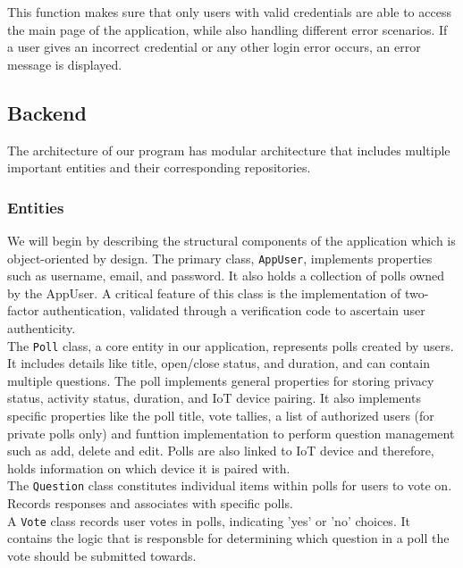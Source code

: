 \noindent This function makes sure that only users with valid credentials are able to access the main page of the application, while also handling 
different error scenarios. If a user gives an incorrect credential or any other login error occurs, an error message is displayed. \\

\subsection{Backend}
The architecture of our program has modular architecture that includes multiple important entities and their corresponding repositories.

\subsubsection{Entities}
We will begin by describing the structural components of the application which is object-oriented by design. The primary class, \texttt{AppUser}, implements properties such as username, email, and password. It also holds a collection of polls owned by the AppUser.  A critical feature of this class is the implementation of two-factor authentication, validated through a verification code to ascertain user authenticity. \\

\noindent The \texttt{Poll} class, a core entity in our application, represents polls created by users. It includes details like title, open/close status, and duration, and can contain multiple questions. The poll implements general properties for storing privacy status, activity status, duration, and IoT device pairing. It also implements specific properties like the poll title, vote tallies, a list of authorized users (for private polls only) and funttion implementation to perform question management such as add, delete and edit. Polls are also linked to IoT device and therefore, holds information on which device it is paired with.\\

\noindent The \texttt{Question} class constitutes individual items within polls for users to vote on. Records responses and associates with specific polls.\\

\noindent A \texttt{Vote} class records user votes in polls, indicating 'yes' or 'no' choices. It contains the logic that is responsble for determining which question in a poll the vote should be submitted towards.\\


